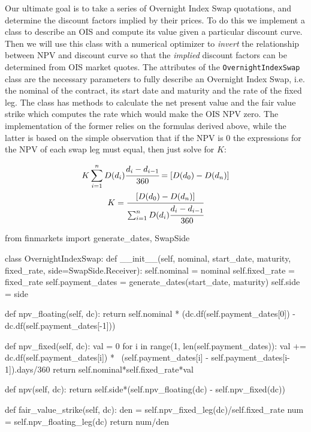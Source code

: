 \begin{finmarkets}
Our ultimate goal is to take a series of Overnight Index Swap quotations, and determine the discount factors implied by their prices. To do this we implement a class to describe an OIS and compute its value given a particular discount curve. Then we will use this class with a numerical optimizer to \emph{invert} the relationship between NPV and discount curve so that the \emph{implied} discount factors can be determined from OIS market quotes.
The attributes of the \texttt{OvernightIndexSwap} class are the necessary parameters to fully describe an Overnight Index Swap, i.e. the nominal of the contract, its start date and maturity and the rate of the fixed leg. The class has methods to calculate the net present value and the fair value strike which computes the rate which would make the OIS NPV zero. The implementation of the former relies on the formulas derived above, while the latter is based on the simple observation that if the NPV is 0 the expressions for the NPV of each swap leg must equal, then just solve for $K$:

\begin{equation}
\begin{gathered}
K \sum_{i=1}^{n}D(d_{i})\cfrac{d_i - d_{i-1}}{360} = [D(d_0) - D(d_n)] \\
K = \cfrac{[D(d_0) - D(d_n)]}{\sum_{i=1}^{n}D(d_{i})\cfrac{d_i - d_{i-1}}{360}}
\end{gathered}
\end{equation}
\end{finmarkets}

\begin{ipython}
from finmarkets import generate_dates, SwapSide

class OvernightIndexSwap:
    def __init__(self, nominal, start_date, maturity, fixed_rate, side=SwapSide.Receiver):
        self.nominal = nominal
        self.fixed_rate = fixed_rate
        self.payment_dates = generate_dates(start_date, maturity)
        self.side = side
      
    def npv_floating(self, dc):
        return self.nominal * (dc.df(self.payment_dates[0]) - dc.df(self.payment_dates[-1]))
  
    def npv_fixed(self, dc):
        val = 0
        for i in range(1, len(self.payment_dates)):
            val += dc.df(self.payment_dates[i]) * \
                    (self.payment_dates[i] - self.payment_dates[i-1]).days/360 
        return self.nominal*self.fixed_rate*val
  
    def npv(self, dc):
        return self.side*(self.npv_floating(dc) - self.npv_fixed(dc))

    def fair_value_strike(self, dc):
        den = self.npv_fixed_leg(dc)/self.fixed_rate
        num = self.npv_floating_leg(dc)
        return num/den
\end{ipython}

